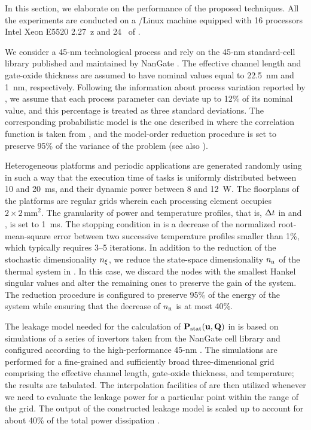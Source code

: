 In this section, we elaborate on the performance of the proposed techniques.
All the experiments are conducted on a /Linux machine equipped with 16 processors Intel Xeon E5520 2.27~z and 24~ of .

We consider a 45-nm technological process and rely on the 45-nm standard-cell library published and maintained by NanGate \cite{nangate}.
The effective channel length and gate-oxide thickness are assumed to have nominal values equal to 22.5~nm and 1~nm, respectively.
Following the information about process variation reported by  \cite{itrs}, we assume that each process parameter can deviate up to 12\% of its nominal value, and this percentage is treated as three standard deviations.
The corresponding probabilistic model is the one described in  where the correlation function is taken from \cite{ukhov2014}, and the model-order reduction procedure is set to preserve 95\% of the variance of the problem (see also ).

Heterogeneous platforms and periodic applications are generated randomly using  \cite{dick1998} in such a way that the execution time of tasks is uniformly distributed between 10 and 20~ms, and their dynamic power between 8 and 12~W.
The floorplans of the platforms are regular grids wherein each processing element occupies $2 \times 2\,\text{mm}^2$.
The granularity of power and temperature profiles, that is, $\Delta t$ in  and , is set to 1~ms.
The stopping condition in  is a decrease of the normalized root-mean-square error between two successive temperature profiles smaller than 1\%, which typically requires 3--5 iterations.
In addition to the reduction of the stochastic dimensionality ${n_\xi}$, we reduce the state-space dimensionality ${n_\text{n}}$ of the thermal system in .
In this case, we discard the nodes with the smallest Hankel singular values and alter the remaining ones to preserve the  gain of the system.
The reduction procedure is configured to preserve 95\% of the energy of the system while ensuring that the decrease of ${n_\text{n}}$ is at most 40\%.

The leakage model needed for the calculation of $\mathbf{P}_{\text{stat}}(\mathbf{u}, \mathbf{Q})$ in  is based on  simulations of a series of  invertors taken from the NanGate cell library and configured according to the high-performance 45-nm  \cite{ptm}.
The simulations are performed for a fine-grained and sufficiently broad three-dimensional grid comprising the effective channel length, gate-oxide thickness, and temperature; the results are tabulated.
The interpolation facilities of  \cite{matlab} are then utilized whenever we need to evaluate the leakage power for a particular point within the range of the grid.
The output of the constructed leakage model is scaled up to account for about 40\% of the total power dissipation \cite{liu2007}.

